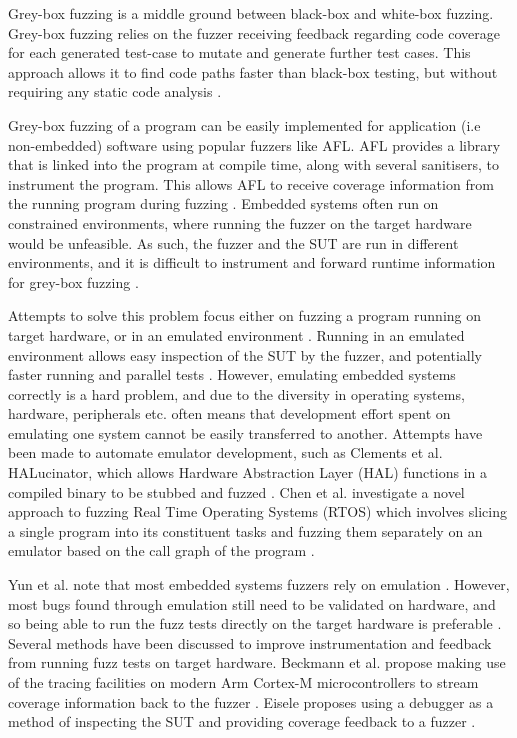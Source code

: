 \documentclass[../report.tex]{subfiles}
\begin{document}
Grey-box fuzzing is a middle ground between black-box and white-box fuzzing.
Grey-box fuzzing relies on the fuzzer receiving feedback regarding code
coverage for each generated test-case to mutate and generate further test
cases. This approach allows it to find code paths faster than black-box
testing, but without requiring any static code analysis \citep{Yun_2022}.

Grey-box fuzzing of a program can be easily implemented for application (i.e
non-embedded) software using popular fuzzers like AFL. AFL provides a library
that is linked into the program at compile time, along with several sanitisers,
to instrument the program. This allows AFL to receive coverage information from
the running program during fuzzing \citep{AFL_2019}. Embedded systems often run on
constrained environments, where running the fuzzer on the target hardware would
be unfeasible. As such, the fuzzer and the SUT are run in different
environments, and it is difficult to instrument and forward runtime information
for grey-box fuzzing \citep{Muench_2018}.

Attempts to solve this problem focus either on fuzzing a program running on
target hardware, or in an emulated environment \citep{Eisele_et_al_2022}.
Running in an emulated environment allows easy inspection of the SUT by the
fuzzer, and potentially faster running and parallel tests
\citep{Eisele_et_al_2022}. However, emulating embedded systems correctly is a
hard problem, and due to the diversity in operating systems, hardware,
peripherals etc. often means that development effort spent on emulating one
system cannot be easily transferred to another. Attempts have been made to
automate emulator development, such as Clements et al. HALucinator, which
allows Hardware Abstraction Layer (HAL) functions in a compiled binary to be
stubbed and fuzzed \citep{Clements_2021}.
Chen et al. investigate a novel approach to fuzzing Real Time Operating Systems
(RTOS) which involves slicing a single program into its constituent tasks and
fuzzing them separately on an emulator based on the call graph of the program
\citep{Chen_2022}.

Yun et al. note that most embedded systems fuzzers rely on emulation
\citep{Yun_2022}. However, most bugs found through emulation still need to be
validated on hardware, and so being able to run the fuzz tests directly on the
target hardware is preferable \citep{Eisele_et_al_2022}. Several methods have
been discussed to improve instrumentation and feedback from running fuzz tests
on target hardware. Beckmann et al. propose making use of the tracing
facilities on modern Arm Cortex-M microcontrollers to stream coverage
information back to the fuzzer \citep{Beckmann_2023}. Eisele proposes using a
debugger as a method of inspecting the SUT and providing coverage feedback to a
fuzzer \citep{Eisele_2022}.
\end{document}
